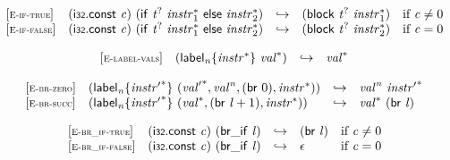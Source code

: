 $$
\begin{array}{@{}l@{}lcl@{}l@{}}
{[\textsc{\scriptsize E{-}if{-}true}]} \quad & (\mathsf{i{\scriptstyle32}}.\mathsf{const}~{\mathit{c}})~(\mathsf{if}~{{\mathit{t}}^?}~{{\mathit{instr}}_{{1}}^\ast}~\mathsf{else}~{{\mathit{instr}}_{{2}}^\ast}) &\hookrightarrow& (\mathsf{block}~{{\mathit{t}}^?}~{{\mathit{instr}}_{{1}}^\ast}) &\quad
  \mbox{if}~{\mathit{c}} \neq 0 \\
{[\textsc{\scriptsize E{-}if{-}false}]} \quad & (\mathsf{i{\scriptstyle32}}.\mathsf{const}~{\mathit{c}})~(\mathsf{if}~{{\mathit{t}}^?}~{{\mathit{instr}}_{{1}}^\ast}~\mathsf{else}~{{\mathit{instr}}_{{2}}^\ast}) &\hookrightarrow& (\mathsf{block}~{{\mathit{t}}^?}~{{\mathit{instr}}_{{2}}^\ast}) &\quad
  \mbox{if}~{\mathit{c}} = 0 \\
\end{array}
$$

\vspace{1ex}

$$
\begin{array}{@{}l@{}lcl@{}l@{}}
{[\textsc{\scriptsize E{-}label{-}vals}]} \quad & ({{\mathsf{label}}_{{\mathit{n}}}}{\{{{\mathit{instr}}^\ast}\}}~{{\mathit{val}}^\ast}) &\hookrightarrow& {{\mathit{val}}^\ast} &  \\
\end{array}
$$

\vspace{1ex}

$$
\begin{array}{@{}l@{}lcl@{}l@{}}
{[\textsc{\scriptsize E{-}br{-}zero}]} \quad & ({{\mathsf{label}}_{{\mathit{n}}}}{\{{{\mathit{instr}'}^\ast}\}}~({{\mathit{val}'}^\ast}, {{\mathit{val}}^{{\mathit{n}}}}, (\mathsf{br}~0), {{\mathit{instr}}^\ast})) &\hookrightarrow& {{\mathit{val}}^{{\mathit{n}}}}~{{\mathit{instr}'}^\ast} &  \\
{[\textsc{\scriptsize E{-}br{-}succ}]} \quad & ({{\mathsf{label}}_{{\mathit{n}}}}{\{{{\mathit{instr}'}^\ast}\}}~({{\mathit{val}}^\ast}, (\mathsf{br}~{\mathit{l}} + 1), {{\mathit{instr}}^\ast})) &\hookrightarrow& {{\mathit{val}}^\ast}~(\mathsf{br}~{\mathit{l}}) &  \\
\end{array}
$$

\vspace{1ex}

$$
\begin{array}{@{}l@{}lcl@{}l@{}}
{[\textsc{\scriptsize E{-}br\_if{-}true}]} \quad & (\mathsf{i{\scriptstyle32}}.\mathsf{const}~{\mathit{c}})~(\mathsf{br\_if}~{\mathit{l}}) &\hookrightarrow& (\mathsf{br}~{\mathit{l}}) &\quad
  \mbox{if}~{\mathit{c}} \neq 0 \\
{[\textsc{\scriptsize E{-}br\_if{-}false}]} \quad & (\mathsf{i{\scriptstyle32}}.\mathsf{const}~{\mathit{c}})~(\mathsf{br\_if}~{\mathit{l}}) &\hookrightarrow& \epsilon &\quad
  \mbox{if}~{\mathit{c}} = 0 \\
\end{array}
$$

